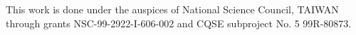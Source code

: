 \documentclass{rsproca}%
\begin{document}
This work is done under the auspices of National Science Council, TAIWAN through grants NSC-99-2922-I-606-002 and CQSE subproject No. 5 99R-80873.









\end{document}
